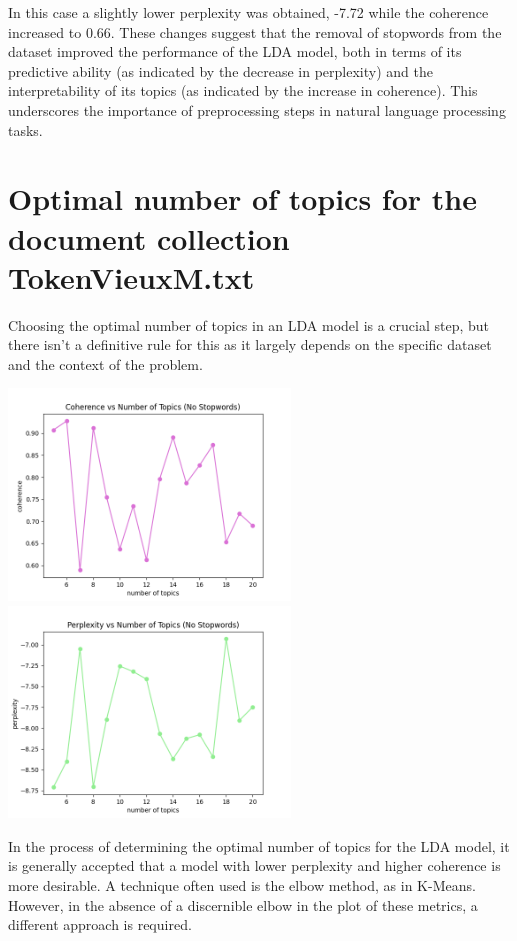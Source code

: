\documentclass[10pt]{article} %
\begin{document}
	In this case a slightly lower perplexity was obtained, -7.72 while the coherence increased to 0.66. These changes suggest that the removal of stopwords from the dataset improved the performance of the LDA model, both in terms of its predictive ability (as indicated by the decrease in perplexity) and the interpretability of its topics (as indicated by the increase in coherence). This underscores the importance of preprocessing steps in natural language processing tasks.
	
	\section{Optimal number of topics for the document collection TokenVieuxM.txt}
	
	Choosing the optimal number of topics in an LDA model is a crucial step, but there isn't a definitive rule for this as it largely depends on the specific dataset and the context of the problem. 
	
	\begin{center}
		\includegraphics[width=7.5cm]{images/coherence_no_stopwords_diff_n_topics}
		\includegraphics[width=7.5cm]{images/perplexity_no_stopwords_diff_n_topics}
	\end{center}
	
	In the process of determining the optimal number of topics for the LDA model, it is generally accepted that a model with lower perplexity and higher coherence is more desirable. A technique often used is the elbow method, as in K-Means. However, in the absence of a discernible elbow in the plot of these metrics, a different approach is required.
	
\end{document}

